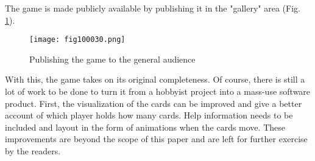 The game is made publicly available by publishing it in the "gallery" area (Fig. \ref{fig100030}).

\begin{figure}[H]
   \centering
   \texttt{[image: fig100030.png]}
   \caption{Publishing the game to the general audience}
\label{fig100030}
\end{figure}

With this, the game takes on its original completeness. Of course, there is still a lot of work to be done to turn it from a hobbyist project into a mass-use software product. First, the visualization of the cards can be improved and give a better account of which player holds how many cards. Help information needs to be included and layout in the form of animations when the cards move. These improvements are beyond the scope of this paper and are left for further exercise by the readers.
